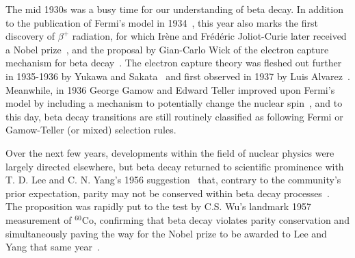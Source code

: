 The mid 1930s was a busy time 
for our understanding of beta decay.  In addition to the publication of Fermi's model in 1934~\cite{Fermi1934Italian,Fermi1934German}, this year also marks the first discovery of $\beta^+$ radiation, for which Irène and Frédéric Joliot-Curie later received a Nobel prize~\cite{joliotcurie1934, nobelprize_1935}, and the proposal by Gian-Carlo Wick of the electron capture mechanism for beta decay~\cite{guerra2009enrico, wick1934sugli}.  
The electron capture theory was fleshed out further in 1935-1936 by Yukawa and Sakata~\cite{yukawa1,yukawa2,yukawa3} and first observed in 1937 by Luis Alvarez~\cite{alvarez1937}.  Meanwhile, in 1936 George Gamow and Edward Teller improved upon Fermi's model by including a mechanism to potentially change the nuclear spin~\cite{GamowTeller}, and to this day, beta decay transitions are still routinely classified as following Fermi or Gamow-Teller (or mixed) selection rules.

Over the next few years, developments within the field of nuclear physics were largely directed elsewhere, but beta decay returned to scientific prominence with T. D. Lee and C. N. Yang's 1956 suggestion~ 
that, contrary to the community's prior expectation, parity may not be conserved within beta decay processes~\cite{LeeYang}.
~  The proposition was rapidly put to the test by C.S. Wu's landmark 1957 measurement of $^{60}$Co, confirming that beta decay violates parity conservation and simultaneously paving the way for the Nobel prize to be awarded to Lee and Yang that same year~\cite{wu}.~
~

